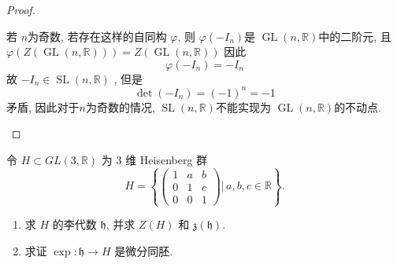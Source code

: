 \documentclass[../main.tex]{subfiles}
\begin{document}
\begin{proof}
\begin{enumerate}
  若 \(  n  \)为奇数, 若存在这样的自同构 \(   \varphi   \), 则  \(   \varphi \left( -I_{n} \right)   \)是 \(  \operatorname{GL} \left( n,\mathbb{R}  \right)   \)中的二阶元, 且 \(   \varphi \left( Z\left( \operatorname{GL} \left( n,\mathbb{R}  \right)  \right)  \right)= Z\left( \operatorname{GL} \left( n,\mathbb{R}  \right)  \right)    \)  因此\[
   \varphi \left( -I_{n} \right)= -I_{n} 
  \]  故 \(  -I_{n}\in \operatorname{SL}\left( n,\mathbb{R}  \right)   \) , 但是 \[
  \det \left( -I_{n} \right)= \left( -1 \right)^{n}= -1  
  \]矛盾, 因此对于\(  n  \)为奇数的情况, \(  \operatorname{SL}\left( n,\mathbb{R}  \right)   \)不能实现为 \(  \operatorname{GL} \left( n,\mathbb{R}  \right)   \)的不动点.   
  \end{enumerate}
  
\end{proof}
\begin{exercise}{}{}
 令 \(H \subset GL(3,\mathbb{R})\) 为 3 维 Heisenberg 群
\[
H=\left\{\begin{pmatrix}
1 & a & b\\
0 & 1 & c\\
0 & 0 & 1
\end{pmatrix}\Bigg|\, a,b,c\in\mathbb{R}\right\}.
\]

\begin{enumerate}
  \item 求 \(H\) 的李代数 \(\mathfrak{h}\), 并求 \(Z(H)\) 和 \(\mathfrak{z}(\mathfrak{h})\).
  \item 求证 \(\operatorname{exp}:\mathfrak{h}\to H\) 是微分同胚.
\end{enumerate}
\end{exercise}
\end{document}
